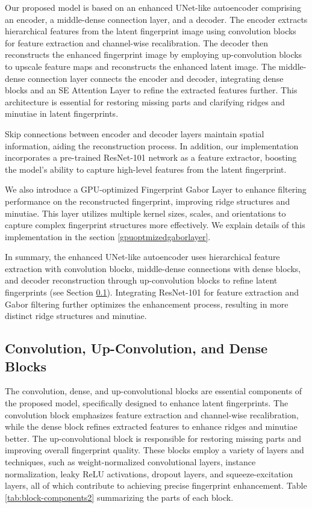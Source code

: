 \documentclass[twocolumn, switch]{article} %
\begin{document}
Our proposed model is based on an enhanced UNet-like autoencoder comprising an encoder, a middle-dense connection layer, and a decoder. The encoder extracts hierarchical features from the latent fingerprint image using convolution blocks for feature extraction and channel-wise recalibration. The decoder then reconstructs the enhanced fingerprint image by employing up-convolution blocks to upscale feature maps and reconstructs the enhanced latent image. The middle-dense connection layer connects the encoder and decoder, integrating dense blocks and an SE Attention Layer to refine the extracted features further. This architecture is essential for restoring missing parts and clarifying ridges and minutiae in latent fingerprints.

Skip connections between encoder and decoder layers maintain spatial information, aiding the reconstruction process. In addition, our implementation incorporates a pre-trained ResNet-101 network as a feature extractor, boosting the model's ability to capture high-level features from the latent fingerprint. 

We also introduce a GPU-optimized Fingerprint Gabor Layer to enhance filtering performance on the reconstructed fingerprint, improving ridge structures and minutiae. This layer utilizes multiple kernel sizes, scales, and orientations to capture complex fingerprint structures more effectively. We explain details of this implementation in the section \ref{gpuoptmizedgaborlayer}.

In summary, the enhanced UNet-like autoencoder uses hierarchical feature extraction with convolution blocks, middle-dense connections with dense blocks, and decoder reconstruction through up-convolution blocks to refine latent fingerprints (see Section \ref{convupconvdenseblocks}). Integrating ResNet-101 for feature extraction and Gabor filtering further optimizes the enhancement process, resulting in more distinct ridge structures and minutiae.



\subsection{Convolution, Up-Convolution, and Dense Blocks}
\label{convupconvdenseblocks}

The convolution, dense, and up-convolutional blocks are essential components of the proposed model, specifically designed to enhance latent fingerprints. The convolution block emphasizes feature extraction and channel-wise recalibration, while the dense block refines extracted features to enhance ridges and minutiae better. The up-convolutional block is responsible for restoring missing parts and improving overall fingerprint quality. These blocks employ a variety of layers and techniques, such as weight-normalized convolutional layers, instance normalization, leaky ReLU activations, dropout layers, and squeeze-excitation layers, all of which contribute to achieving precise fingerprint enhancement. Table \ref{tab:block-components2} summarizing the parts of each block.
\end{document}
